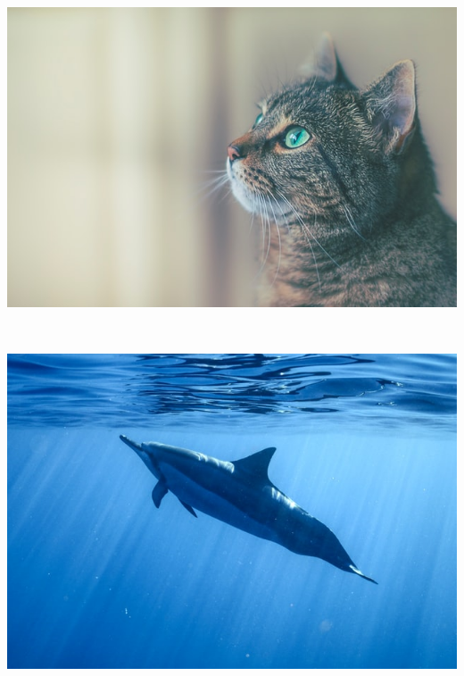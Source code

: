 \documentclass[11pt, a4paper]{article}
\begin{document}
\begin{example}
\begin{gridlayout}{\textwidth}{11cm}
\begin{row}{0.65}
\begin{cell}{0.3}
            \end{cell}
        \end{row}
        \begin{row}{0.05}
            \begin{cell}{1}
                ~ 
            \end{cell}
        \end{row}
        \begin{row}{0.3}
            \begin{cell}{0.3}
                \includegraphics[width=\cellwidth, height=\rowheight, keepaspectratio]{img/cat.jpg}
            \end{cell}
            \begin{cell}{0.05}
                ~
            \end{cell}
            \begin{cell}{0.3}
                \includegraphics[width=\cellwidth, height=\rowheight, keepaspectratio]{img/dolphin.jpg}

\end{cell}
\end{row}
\end{gridlayout}
\end{example}
\end{document}
